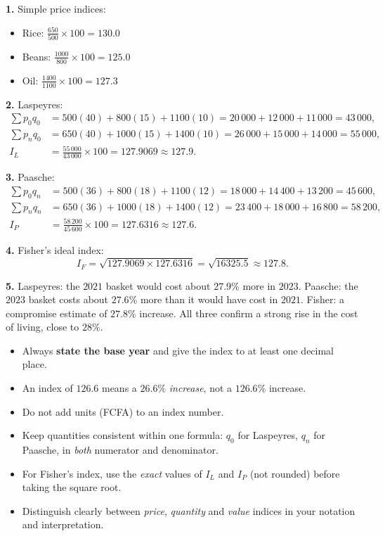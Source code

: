 \documentclass[11pt]{article}
\begin{document}
\begin{corrige}[Exercise 1]
\textbf{1.} Simple price indices:
\begin{itemize}
\item Rice: $\frac{650}{500}\times100 = 130.0$
\item Beans: $\frac{1000}{800}\times100 = 125.0$
\item Oil: $\frac{1400}{1100}\times100 = 127.3$
\end{itemize}

\textbf{2.} Laspeyres:
\begin{align*}
\sum p_0 q_0 &= 500(40)+800(15)+1100(10) = 20\,000+12\,000+11\,000 = 43\,000,\\
\sum p_n q_0 &= 650(40)+1000(15)+1400(10) = 26\,000+15\,000+14\,000 = 55\,000,\\
I_L &= \frac{55\,000}{43\,000}\times 100 = 127.9069 \approx 127.9.
\end{align*}

\textbf{3.} Paasche:
\begin{align*}
\sum p_0 q_n &= 500(36)+800(18)+1100(12) = 18\,000+14\,400+13\,200 = 45\,600,\\
\sum p_n q_n &= 650(36)+1000(18)+1400(12) = 23\,400+18\,000+16\,800 = 58\,200,\\
I_P &= \frac{58\,200}{45\,600}\times 100 = 127.6316 \approx 127.6.
\end{align*}

\textbf{4.} Fisher's ideal index:
\[ I_F = \sqrt{127.9069 \times 127.6316} = \sqrt{16325.5} \approx 127.8. \]

\textbf{5.} Laspeyres: the $2021$ basket would cost about $27.9\%$ more in $2023$. Paasche: the $2023$ basket costs about $27.6\%$ more than it would have cost in $2021$. Fisher: a compromise estimate of $27.8\%$ increase. All three confirm a strong rise in the cost of living, close to $28\%$.
\end{corrige}

\begin{attention}
\begin{itemize}
\item Always \textbf{state the base year} and give the index to at least one decimal place.
\item An index of $126.6$ means a $26.6\%$ \emph{increase}, not a $126.6\%$ increase.
\item Do not add units (FCFA) to an index number.
\item Keep quantities consistent within one formula: $q_0$ for Laspeyres, $q_n$ for Paasche, in \emph{both} numerator and denominator.
\item For Fisher's index, use the \emph{exact} values of $I_L$ and $I_P$ (not rounded) before taking the square root.
\item Distinguish clearly between \emph{price}, \emph{quantity} and \emph{value} indices in your notation and interpretation.
\end{itemize}
\end{attention}
\end{document}
